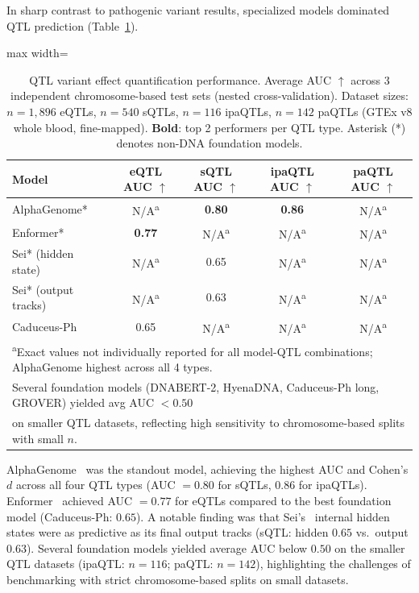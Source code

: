 \documentclass[11pt]{article}
\begin{document}
In sharp contrast to pathogenic variant results, specialized models dominated QTL prediction (Table~\ref{tab:qtl}).

\begin{table}[htbp]
\centering
\caption{QTL variant effect quantification performance. Average AUC $\uparrow$ across 3 independent chromosome-based test sets (nested cross-validation). Dataset sizes: $n = 1{,}896$ eQTLs, $n = 540$ sQTLs, $n = 116$ ipaQTLs, $n = 142$ paQTLs (GTEx v8 whole blood, fine-mapped). \textbf{Bold}: top 2 performers per QTL type. Asterisk (*) denotes non-DNA foundation models.}
\label{tab:qtl}
\begin{adjustbox}{max width=\textwidth}
\begin{tabular}{lcccc}
\toprule
\textbf{Model} & \textbf{eQTL AUC $\uparrow$} & \textbf{sQTL AUC $\uparrow$} & \textbf{ipaQTL AUC $\uparrow$} & \textbf{paQTL AUC $\uparrow$} \\
\midrule
AlphaGenome* & N/A\textsuperscript{a} & \textbf{0.80} & \textbf{0.86} & N/A\textsuperscript{a} \\
Enformer* & \textbf{0.77} & N/A\textsuperscript{a} & N/A\textsuperscript{a} & N/A\textsuperscript{a} \\
Sei* (hidden state) & N/A\textsuperscript{a} & 0.65 & N/A\textsuperscript{a} & N/A\textsuperscript{a} \\
Sei* (output tracks) & N/A\textsuperscript{a} & 0.63 & N/A\textsuperscript{a} & N/A\textsuperscript{a} \\
Caduceus-Ph & 0.65 & N/A\textsuperscript{a} & N/A\textsuperscript{a} & N/A\textsuperscript{a} \\
\bottomrule
\multicolumn{5}{l}{\footnotesize \textsuperscript{a}Exact values not individually reported for all model-QTL combinations; AlphaGenome highest across all 4 types.} \\
\multicolumn{5}{l}{\footnotesize Several foundation models (DNABERT-2, HyenaDNA, Caduceus-Ph long, GROVER) yielded avg AUC $< 0.50$} \\
\multicolumn{5}{l}{\footnotesize on smaller QTL datasets, reflecting high sensitivity to chromosome-based splits with small $n$.} \\
\end{tabular}
\end{adjustbox}
\end{table}

AlphaGenome~\citep{cheng2024alphagenome} was the standout model, achieving the highest AUC and Cohen's $d$ across all four QTL types (AUC $= 0.80$ for sQTLs, $0.86$ for ipaQTLs). Enformer~\citep{avsec2021effective} achieved AUC $= 0.77$ for eQTLs compared to the best foundation model (Caduceus-Ph: $0.65$). A notable finding was that Sei's~\citep{chen2022sei} internal hidden states were as predictive as its final output tracks (sQTL: hidden $0.65$ vs.\ output $0.63$). Several foundation models yielded average AUC below $0.50$ on the smaller QTL datasets (ipaQTL: $n = 116$; paQTL: $n = 142$), highlighting the challenges of benchmarking with strict chromosome-based splits on small datasets.
\end{document}
